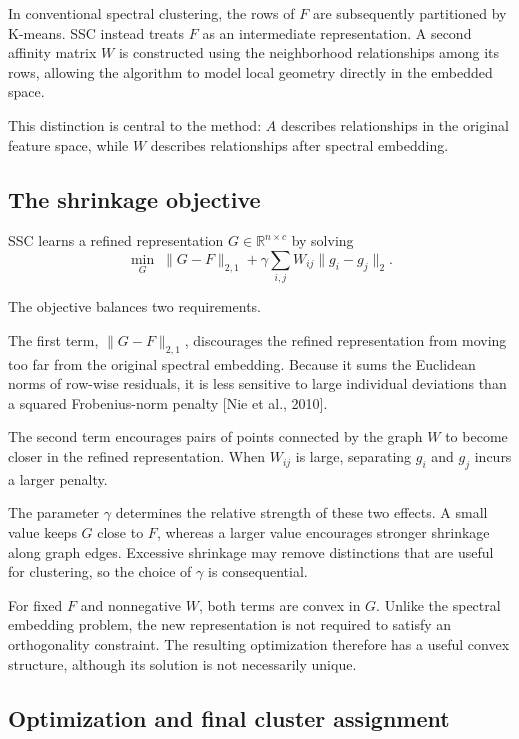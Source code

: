 \documentclass{article}
\begin{document}
In conventional spectral clustering, the rows of \(F\) are subsequently partitioned by K-means. SSC instead treats \(F\) as an intermediate representation. A second affinity matrix \(W\) is constructed using the neighborhood relationships among its rows, allowing the algorithm to model local geometry directly in the embedded space.

This distinction is central to the method: \(A\) describes relationships in the original feature space, while \(W\) describes relationships after spectral embedding.

\subsection{The shrinkage objective}

SSC learns a refined representation \(G\in\mathbb{R}^{n\times c}\) by solving
\[
\min_G\;
\|G-F\|_{2,1}
+
\gamma\sum_{i,j}W_{ij}\|g_i-g_j\|_2.
\]

The objective balances two requirements.

The first term, \(\|G-F\|_{2,1}\), discourages the refined representation from moving too far from the original spectral embedding. Because it sums the Euclidean norms of row-wise residuals, it is less sensitive to large individual deviations than a squared Frobenius-norm penalty [Nie et al., 2010].

The second term encourages pairs of points connected by the graph \(W\) to become closer in the refined representation. When \(W_{ij}\) is large, separating \(g_i\) and \(g_j\) incurs a larger penalty.

The parameter \(\gamma\) determines the relative strength of these two effects. A small value keeps \(G\) close to \(F\), whereas a larger value encourages stronger shrinkage along graph edges. Excessive shrinkage may remove distinctions that are useful for clustering, so the choice of \(\gamma\) is consequential.

For fixed \(F\) and nonnegative \(W\), both terms are convex in \(G\). Unlike the spectral embedding problem, the new representation is not required to satisfy an orthogonality constraint. The resulting optimization therefore has a useful convex structure, although its solution is not necessarily unique.

\subsection{Optimization and final cluster assignment}
\end{document}
